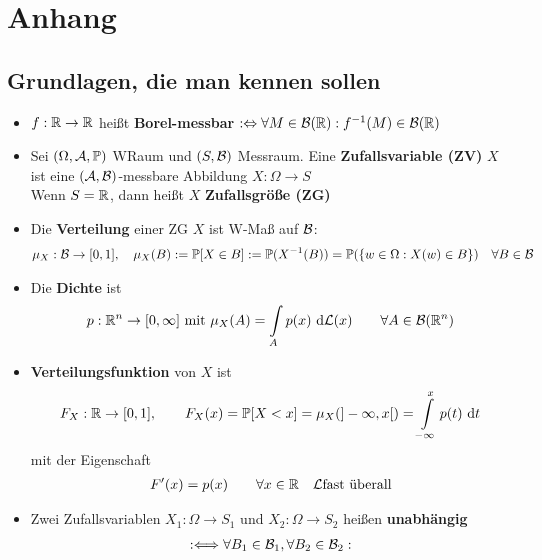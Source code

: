 
\setcounter{chapter}{0}
\renewcommand{\thechapter}{\Alph{chapter}}
\chapter{Anhang}
\setcounter{equation}{1}
\section{Grundlagen, die man kennen sollen}
\begin{itemize}
\item $f:\mathbb{R}\to\mathbb{R}$ heißt \textbf{Borel-messbar} $:\Leftrightarrow\forall M\in\mathcal{B}(\mathbb{R}):f^{-1}(M)\in\mathcal{B}(\mathbb{R})$
\item Sei $(\Omega,\mathcal{A}, \mathbb{P})$ WRaum und $(S,\mathcal{B})$ Messraum. Eine \textbf{Zufallsvariable (ZV)} $X$ ist eine $(\mathcal{A},\mathcal{B})$-messbare Abbildung $X:\Omega\to S$\\
Wenn $S=\mathbb{R}$, dann heißt $X$ \textbf{Zufallsgröße (ZG)}
\item Die \textbf{Verteilung} einer ZG $X$ ist W-Maß auf $\mathcal{B}$:
\begin{align*}
\mu_X:\mathcal{B}\to[0,1],\quad
\mu_X(B):=\mathbb{P}[X\in B]:=\mathbb{P}(X^{-1}(B))=\mathbb{P}(\lbrace w\in\Omega:X(w)\in B\rbrace)\quad\forall B\in\mathcal{B}
\end{align*}
\item Die \textbf{Dichte} ist
\begin{align*}
p:\mathbb{R}^n\to[0,\infty]\text{ mit } \mu_X(A)=\int\limits_A p(x)\text{ d}\mathcal{L}(x)\qquad\forall A\in\mathcal{B}(\mathbb{R}^n)
\end{align*}
\item \textbf{Verteilungsfunktion} von $X$ ist
\begin{align*}
F_X:\mathbb{R}\to[0,1],\qquad F_X(x)=\mathbb{P}[X<x]=\mu_X(]-\infty,x[)=\int\limits_{-\infty}^x p(t)\text{ d} t
\end{align*}
mit der Eigenschaft
\begin{align*}
F'(x)=p(x)\qquad\forall x\in\mathbb{R}~~~\mathcal{L}\text{fast überall}
\end{align*}
\item Zwei Zufallsvariablen $X_1:\Omega\to S_1$ und $X_2:\Omega\to S_2$ heißen \textbf{unabhängig} 
\begin{align*}
:\Longleftrightarrow
\forall B_1\in\B_1,\forall B_2\in\B_2:

\end{align*}
\end{itemize}
